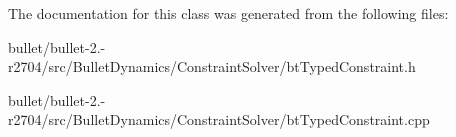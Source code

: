 The documentation for this class was generated from the following files\+:\begin{DoxyCompactItemize}
\item 
bullet/bullet-\/2.-\/r2704/src/\+Bullet\+Dynamics/\+Constraint\+Solver/bt\+Typed\+Constraint.\+h\item 
bullet/bullet-\/2.-\/r2704/src/\+Bullet\+Dynamics/\+Constraint\+Solver/bt\+Typed\+Constraint.\+cpp\end{DoxyCompactItemize}
